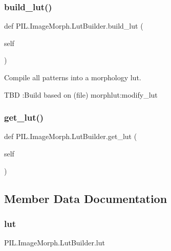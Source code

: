 \subsubsection{\texorpdfstring{build\+\_\+lut()}{build\_lut()}}
{\footnotesize\ttfamily def P\+I\+L.\+Image\+Morph.\+Lut\+Builder.\+build\+\_\+lut (\begin{DoxyParamCaption}\item[{}]{self }\end{DoxyParamCaption})}

\begin{DoxyVerb}Compile all patterns into a morphology lut.

TBD :Build based on (file) morphlut:modify_lut
\end{DoxyVerb}
 \mbox{\label{classPIL_1_1ImageMorph_1_1LutBuilder_af02c47d0f7d9f078d5fc6fc58a1edf9e}} 
\subsubsection{\texorpdfstring{get\+\_\+lut()}{get\_lut()}}
{\footnotesize\ttfamily def P\+I\+L.\+Image\+Morph.\+Lut\+Builder.\+get\+\_\+lut (\begin{DoxyParamCaption}\item[{}]{self }\end{DoxyParamCaption})}



\subsection{Member Data Documentation}
\mbox{\label{classPIL_1_1ImageMorph_1_1LutBuilder_a0aa58dbb19268151aed0479be9e2365d}} 
\subsubsection{\texorpdfstring{lut}{lut}}
{\footnotesize\ttfamily P\+I\+L.\+Image\+Morph.\+Lut\+Builder.\+lut}

